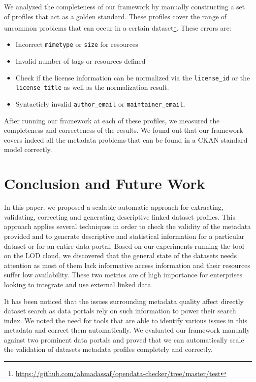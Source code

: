 \documentclass[runningheads,a4paper]{llncs}
\begin{document}
{We analyzed the completeness of our framework by manually constructing a set of profiles that act as a golden standard. These profiles cover the range of uncommon problems that can occur in a certain dataset\footnote{\url{https://github.com/ahmadassaf/opendata-checker/tree/master/test}}. These errors are:

\begin{itemize}
\item Incorrect \texttt{mimetype} or \texttt{size} for resources
\item Invalid number of tags or resources defined
\item Check if the license information can be normalized via the \texttt{license\_id} or the \texttt{license\_title} as well as the normalization result.
\item Syntacticly invalid \texttt{author\_email} or \texttt{maintainer\_email}.
\end{itemize}


After running our framework at each of these profiles, we measured the completeness and correcteness of the results. We found out that our framework covers indeed all the metadata problems that can be found in a CKAN standard model correctly.

\section{Conclusion and Future Work}
\label{sec:conclusion}

In this paper, we proposed a scalable automatic approach for extracting, validating, correcting and generating descriptive linked dataset profiles. This approach applies several techniques in order to check the validity of the metadata provided and to generate descriptive and statistical information for a particular dataset or for an entire data portal. Based on our experiments running the tool on the LOD cloud, we discovered that the general state of the datasets needs attention as most of them lack informative access information and their resources suffer low availability. These two metrics are of high importance for enterprises looking to integrate and use external linked data.

It has been noticed that the issues surrounding metadata quality affect directly dataset search as data portals rely on such information to power their search index. We noted the need for tools that are able to identify various issues in this metadata and correct them automatically. We evaluated our framework manually against two prominent data portals and proved that we can automatically scale the validation of datasets metadata profiles completely and correctly.

}
\end{document}
